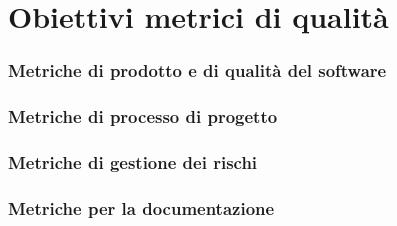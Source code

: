 \section{Obiettivi metrici di qualità}
\subsubsection{Metriche di prodotto e di qualità del software}



\subsubsection{Metriche di processo di progetto}


\subsubsection{Metriche di gestione dei rischi}


\subsubsection{Metriche per la documentazione}

